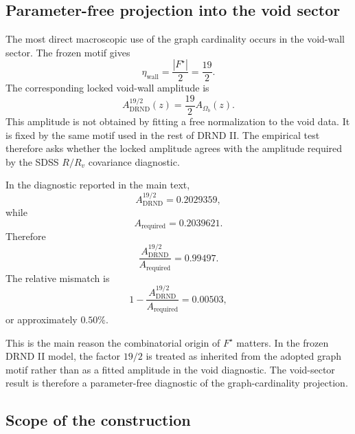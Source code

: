 \documentclass[12pt]{iopart}
\begin{document}
\subsection{Parameter-free projection into the void sector}

The most direct macroscopic use of the graph cardinality occurs in the void-wall sector. The frozen motif gives
\begin{equation}
\eta_{\mathrm{wall}}
=
\frac{|F^\star|}{2}
=
\frac{19}{2}.
\end{equation}
The corresponding locked void-wall amplitude is
\begin{equation}
A_{\mathrm{DRND}}^{19/2}(z)
=
\frac{19}{2}A_{\Omega_b}(z).
\end{equation}
This amplitude is not obtained by fitting a free normalization to the void data. It is fixed by the same motif used in the rest of DRND II. The empirical test therefore asks whether the locked amplitude agrees with the amplitude required by the SDSS \(R/R_v\) covariance diagnostic.

In the diagnostic reported in the main text,
\begin{equation}
A_{\mathrm{DRND}}^{19/2}
=
0.2029359,
\end{equation}
while
\begin{equation}
A_{\mathrm{required}}
=
0.2039621.
\end{equation}
Therefore
\begin{equation}
\frac{
A_{\mathrm{DRND}}^{19/2}
}{
A_{\mathrm{required}}
}
=
0.99497.
\end{equation}
The relative mismatch is
\begin{equation}
1-
\frac{
A_{\mathrm{DRND}}^{19/2}
}{
A_{\mathrm{required}}
}
=
0.00503,
\end{equation}
or approximately \(0.50\%\).

This is the main reason the combinatorial origin of \(F^\star\) matters. In the frozen DRND II model, the factor \(19/2\) is treated as inherited from the adopted graph motif rather than as a fitted amplitude in the void diagnostic. The void-sector result is therefore a parameter-free diagnostic of the graph-cardinality projection.

\subsection{Scope of the construction}
\end{document}
